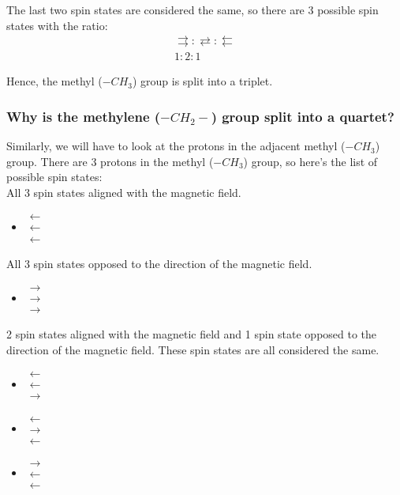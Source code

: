 \documentclass[11pt]{article}
\begin{document}
The last two spin states are considered the same, so there are 3 possible spin states with the ratio:
\begin{align*}
\rightrightarrows : \rightleftarrows : \leftleftarrows \\ 1 : 2 : 1
\end{align*}

Hence, the methyl (\(-CH_3\)) group is split into a triplet.

\newpage

\subsubsection{Why is the methylene (\(-CH_2-\)) group split into a quartet?}
\label{sec:orgd02caaa}
Similarly, we will have to look at the protons in the adjacent methyl (\(-CH_3\)) group. There are 3 protons in the methyl (\(-CH_3\)) group, so here's the list of possible spin states:
\\[0pt]

All 3 spin states aligned with the magnetic field.
\begin{itemize}
\item \(\mathrel{\substack{\textstyle\leftarrow \\[-0.6ex] \textstyle\leftarrow \\[-0.6ex] \textstyle\leftarrow}}\)
\end{itemize}

All 3 spin states opposed to the direction of the magnetic field.
\begin{itemize}
\item \(\mathrel{\substack{\textstyle\rightarrow \\[-0.6ex] \textstyle\rightarrow \\[-0.6ex] \textstyle\rightarrow}}\)
\end{itemize}

2 spin states aligned with the magnetic field and 1 spin state opposed to the direction of the magnetic field. These spin states are all considered the same.
\begin{itemize}
\item \(\mathrel{\substack{\textstyle\leftarrow \\[-0.6ex] \textstyle\leftarrow \\[-0.6ex] \textstyle\rightarrow}}\)
\item \(\mathrel{\substack{\textstyle\leftarrow \\[-0.6ex] \textstyle\rightarrow \\[-0.6ex] \textstyle\leftarrow}}\)
\item \(\mathrel{\substack{\textstyle\rightarrow \\[-0.6ex] \textstyle\leftarrow \\[-0.6ex] \textstyle\leftarrow}}\)
\end{itemize}
\end{document}
